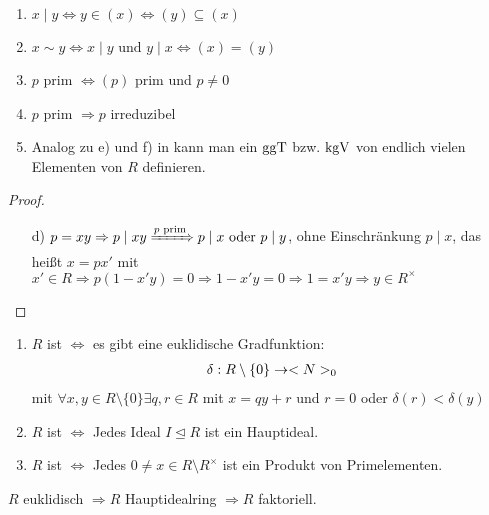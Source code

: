 \begin{remark}
	\begin{enumerate}[label=(\alph*)]
		\item $x \mid y \Leftrightarrow y \in (x) \Leftrightarrow (y) \subseteq (x)$
		\item $x \sim y \Leftrightarrow x \mid y \text{ und } y \mid x \Leftrightarrow (x) = (y)$
		\item $p$ prim $\Leftrightarrow (p)$ prim und $p \neq 0$
		\item $p$ prim $\Rightarrow p$ irreduzibel
		\item Analog zu e) und f) in  kann man ein $\operatorname{ggT}$ bzw. $\operatorname{kgV}$ von endlich vielen Elementen von $R$ definieren.
	\end{enumerate}
\end{remark}
\begin{proof}
	\begin{itemize}
		\item[d)] $p = xy \Rightarrow p \mid xy \xRightarrow{p \text{ prim}} p \mid x \text{ oder } p\mid y$, ohne Einschränkung $p \mid x$, das heißt $x = px'$ mit $x' \in R \Rightarrow p(1-x'y) =0 \Rightarrow 1 - x'y = 0 \Rightarrow 1 = x'y \Rightarrow y \in R^{\times}$
	\end{itemize}
\end{proof}

\begin{definition}
	\begin{enumerate}[label=(\alph*)]
		\item $R$ ist  $\Leftrightarrow$ es gibt eine euklidische Gradfunktion:
		\begin{align}
			\delta: R\setminus \{0\} \to <N>_0 \notag
		\end{align}
		mit $\forall x,y \in R\setminus \{0\} \exists q,r \in R$ mit $x = qy + r$ und $r=0$ oder $\delta(r) < \delta(y)$
		\item $R$ ist  $\Leftrightarrow$ Jedes Ideal $I \unlhd R$ ist ein Hauptideal.
		\item $R$ ist  $\Leftrightarrow$ Jedes $0 \neq x \in R\setminus R^{\times}$ ist ein Produkt von Primelementen.
	\end{enumerate}
\end{definition}

\begin{proposition}
	$R$ euklidisch $\Rightarrow R$ Hauptidealring $\Rightarrow R$ faktoriell.
\end{proposition}

